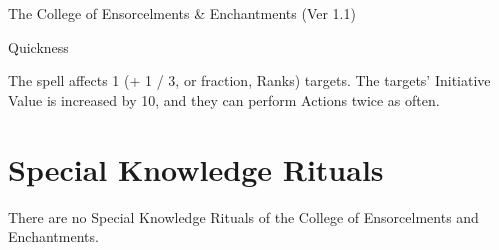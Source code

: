 \begin{Chapter}{The College of Ensorcelments \& Enchantments (Ver 1.1)}
\begin{spell}[S-12]{Quickness }

\begin{effects}
The spell affects 1 (+ 1 / 3, or fraction, Ranks) targets.  The
targets’ Initiative Value is increased by 10, and they can perform
Actions twice as often.
\end{effects}
\end{spell}


\section{Special Knowledge Rituals}

There are no Special Knowledge Rituals of the College of Ensorcelments
and Enchantments.

\end{Chapter}

